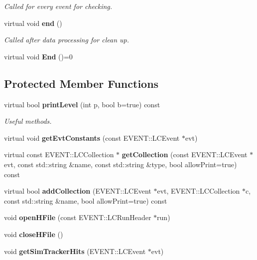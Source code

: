 \begin{DoxyCompactItemize}
\begin{DoxyCompactList}\small\item\em Called for every event for checking. \item\end{DoxyCompactList}\item 
virtual void {\bf end} ()\label{classTBTrackBaseProcessor_aafbf0e1c1af756ea03748e482883d763}

\begin{DoxyCompactList}\small\item\em Called after data processing for clean up. \item\end{DoxyCompactList}\item 
virtual void {\bfseries End} ()=0\label{classTBTrackBaseProcessor_a5103e722aff198e1a86efb76ffb753ae}

\end{DoxyCompactItemize}
\subsection*{Protected Member Functions}
\begin{DoxyCompactItemize}
\item 
virtual bool {\bf printLevel} (int p, bool b=true) const \label{classTBTrackBaseProcessor_ad49019aae6d63f24ddac47796645beb4}

\begin{DoxyCompactList}\small\item\em Useful methods. \item\end{DoxyCompactList}\item 
virtual void {\bfseries getEvtConstants} (const EVENT::LCEvent $\ast$evt)\label{classTBTrackBaseProcessor_ab7f028108220f667f0771c62b50284a7}

\item 
virtual const EVENT::LCCollection $\ast$ {\bfseries getCollection} (const EVENT::LCEvent $\ast$evt, const std::string \&name, const std::string \&type, bool allowPrint=true) const \label{classTBTrackBaseProcessor_a7d6672702b9966e1aa85b277ccb65c1e}

\item 
virtual bool {\bfseries addCollection} (EVENT::LCEvent $\ast$evt, EVENT::LCCollection $\ast$c, const std::string \&name, bool allowPrint=true) const \label{classTBTrackBaseProcessor_a8c506fe8b1a3854dc18729e8c3253f16}

\item 
void {\bfseries openHFile} (const EVENT::LCRunHeader $\ast$run)\label{classTBTrackBaseProcessor_ae88273f99fda5f6a3bcf94b16bcf96c9}

\item 
void {\bfseries closeHFile} ()\label{classTBTrackBaseProcessor_a258362bb0b7dd5126d069cc0bfcda956}

\item 
void {\bfseries getSimTrackerHits} (EVENT::LCEvent $\ast$evt)\label{classTBTrackBaseProcessor_aff9e06323f04642534a8522ea255497d}

\end{DoxyCompactItemize}
